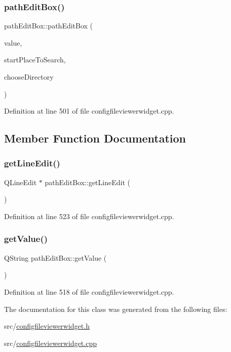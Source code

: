 \subsubsection{\texorpdfstring{pathEditBox()}{pathEditBox()}}
{\footnotesize\ttfamily path\+Edit\+Box\+::path\+Edit\+Box (\begin{DoxyParamCaption}\item[{Q\+String}]{value,  }\item[{Q\+String}]{start\+Place\+To\+Search,  }\item[{bool}]{choose\+Directory }\end{DoxyParamCaption})}



Definition at line 501 of file configfileviewerwidget.\+cpp.



\subsection{Member Function Documentation}
\mbox{\label{classpath_edit_box_a0f16b945ca7ab67e1def8948ca47ed2b}} 
\subsubsection{\texorpdfstring{getLineEdit()}{getLineEdit()}}
{\footnotesize\ttfamily Q\+Line\+Edit $\ast$ path\+Edit\+Box\+::get\+Line\+Edit (\begin{DoxyParamCaption}{ }\end{DoxyParamCaption})}



Definition at line 523 of file configfileviewerwidget.\+cpp.

\mbox{\label{classpath_edit_box_aad823e4a342f4a028ab9a5f619966ed9}} 
\subsubsection{\texorpdfstring{getValue()}{getValue()}}
{\footnotesize\ttfamily Q\+String path\+Edit\+Box\+::get\+Value (\begin{DoxyParamCaption}{ }\end{DoxyParamCaption})}



Definition at line 518 of file configfileviewerwidget.\+cpp.



The documentation for this class was generated from the following files\+:\begin{DoxyCompactItemize}
\item 
src/\mbox{\hyperlink{configfileviewerwidget_8h}{configfileviewerwidget.\+h}}\item 
src/\mbox{\hyperlink{configfileviewerwidget_8cpp}{configfileviewerwidget.\+cpp}}\end{DoxyCompactItemize}
